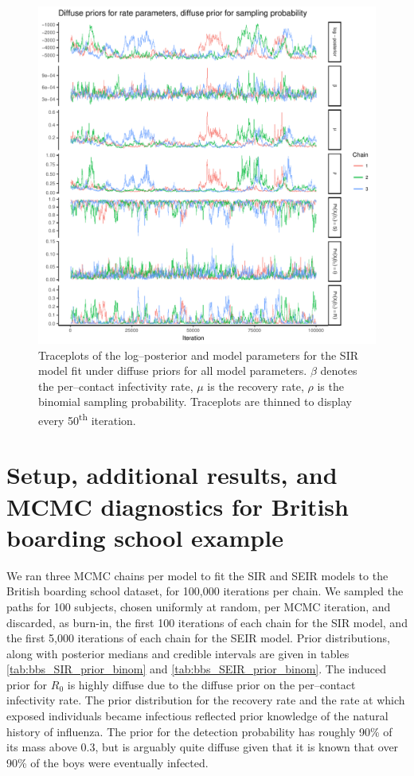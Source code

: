 \begin{figure}[htbp]
	\centering
	\includegraphics[width=0.9\linewidth]{figures/diffuse_diffuse_traceplots.pdf}
	\caption{Traceplots of the log--posterior and model parameters for the SIR model fit under diffuse priors for all model parameters. $ \beta $ denotes the per--contact infectivity rate, $ \mu $ is the recovery rate, $ \rho $ is the binomial sampling probability. Traceplots are thinned to display every 50\textsuperscript{th} iteration.}
	\label{fig:diffuse_diffuse_traces}
\end{figure}

\newpage
\section{Setup, additional results, and MCMC diagnostics for British boarding school example}
\label{sec:bbs_supp}

We ran three MCMC chains per model to fit the SIR and SEIR models to the British boarding school dataset, for 100,000 iterations per chain. We sampled the paths for 100 subjects, chosen uniformly at random, per MCMC iteration, and discarded, as burn-in, the first 100 iterations of each chain for the SIR model, and the first 5,000 iterations of each chain for the SEIR model. Prior distributions, along with posterior medians and credible intervals are given in tables \ref{tab:bbs_SIR_prior_binom} and \ref{tab:bbs_SEIR_prior_binom}. The induced prior for $ R_0 $ is highly diffuse due to the diffuse prior on the per--contact infectivity rate. The prior distribution for the recovery rate and the rate at which exposed individuals became infectious reflected prior knowledge of the natural history of influenza. The prior for the detection probability has roughly 90\% of its mass above 0.3, but is arguably quite diffuse given that it is known that over 90\% of the boys were eventually infected. 

